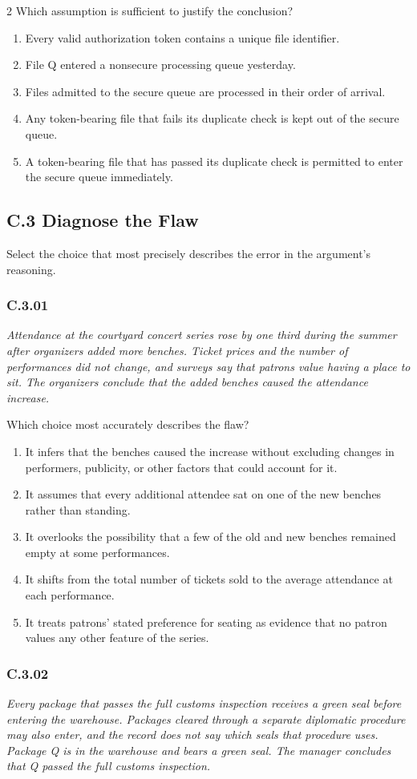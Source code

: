 \documentclass[10pt]{extarticle}
\newcommand{\choice}[1]{\item #1}
\newcommand{\bankitem}[1]{\subsubsection*{#1}}
\begin{document}
\begin{multicols}{2}
Which assumption is sufficient to justify the conclusion?
\begin{enumerate}[label=(\alph*)]
  \choice{Every valid authorization token contains a unique file identifier.}
  \choice{File Q entered a nonsecure processing queue yesterday.}
  \choice{Files admitted to the secure queue are processed in their order of arrival.}
  \choice{Any token-bearing file that fails its duplicate check is kept out of the secure queue.}
  \choice{A token-bearing file that has passed its duplicate check is permitted to enter the secure queue immediately.}
\end{enumerate}
\subsection*{C.3 Diagnose the Flaw}
Select the choice that most precisely describes the error in the argument's reasoning.
\bankitem{C.3.01}
\emph{Attendance at the courtyard concert series rose by one third during the summer after organizers added more benches. Ticket prices and the number of performances did not change, and surveys say that patrons value having a place to sit. The organizers conclude that the added benches caused the attendance increase.}

Which choice most accurately describes the flaw?
\begin{enumerate}[label=(\alph*)]
  \choice{It infers that the benches caused the increase without excluding changes in performers, publicity, or other factors that could account for it.}
  \choice{It assumes that every additional attendee sat on one of the new benches rather than standing.}
  \choice{It overlooks the possibility that a few of the old and new benches remained empty at some performances.}
  \choice{It shifts from the total number of tickets sold to the average attendance at each performance.}
  \choice{It treats patrons' stated preference for seating as evidence that no patron values any other feature of the series.}
\end{enumerate}
\bankitem{C.3.02}
\emph{Every package that passes the full customs inspection receives a green seal before entering the warehouse. Packages cleared through a separate diplomatic procedure may also enter, and the record does not say which seals that procedure uses. Package Q is in the warehouse and bears a green seal. The manager concludes that Q passed the full customs inspection.}


\end{multicols}
\end{document}
